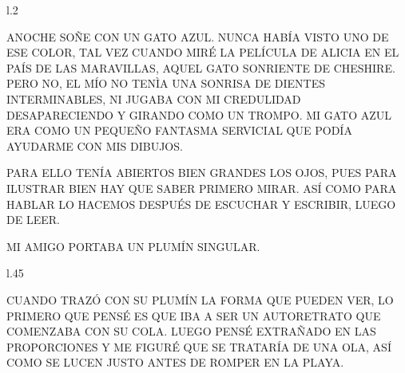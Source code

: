 %



\newpage
{}
\begin{wrapfigure} [7]{l}{.2\textwidth}\vspace{-1.2cm}\hspace{-1.5cm}
	
	\end{wrapfigure}	
ANOCHE SOÑE CON UN GATO AZUL. NUNCA HABÍA VISTO UNO DE ESE COLOR, TAL VEZ CUANDO MIRÉ LA PELÍCULA DE ALICIA EN EL PAÍS DE LAS MARAVILLAS, AQUEL GATO SONRIENTE DE CHESHIRE. PERO NO, EL MÍO NO TENÌA UNA SONRISA DE DIENTES INTERMINABLES, NI JUGABA CON MI CREDULIDAD DESAPARECIENDO Y GIRANDO COMO UN TROMPO. MI GATO AZUL ERA COMO UN PEQUEÑO FANTASMA SERVICIAL QUE PODÍA AYUDARME CON MIS DIBUJOS.

PARA ELLO TENÍA ABIERTOS BIEN GRANDES LOS OJOS, PUES PARA ILUSTRAR BIEN HAY QUE SABER PRIMERO MIRAR. ASÍ COMO PARA HABLAR LO HACEMOS DESPUÉS DE ESCUCHAR Y ESCRIBIR, LUEGO DE LEER. 

MI AMIGO PORTABA UN PLUMÍN SINGULAR.
\newpage
{}
\begin{wrapfigure} [9]{l}{.45\textwidth}\vspace{-1.2cm}%
\end{wrapfigure}
CUANDO TRAZÓ CON SU PLUMÍN LA FORMA QUE PUEDEN VER, LO PRIMERO QUE PENSÉ ES QUE IBA A SER UN AUTORETRATO QUE COMENZABA CON SU COLA. LUEGO PENSÉ EXTRAÑADO EN LAS PROPORCIONES Y ME FIGURÉ QUE SE TRATARÍA DE UNA OLA, ASÍ COMO SE LUCEN JUSTO ANTES DE ROMPER EN LA PLAYA.

